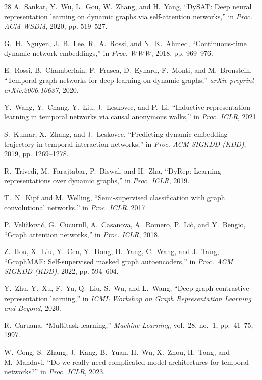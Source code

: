 \documentclass[journal]{IEEEtran}
\begin{document}
\begin{thebibliography}{28}
		A.~Sankar, Y.~Wu, L.~Gou, W.~Zhang, and H.~Yang,
		``DySAT: Deep neural representation learning on dynamic graphs via self-attention networks,''
		in \emph{Proc. ACM WSDM}, 2020, pp. 519--527.

		G.~H.~Nguyen, J.~B.~Lee, R.~A.~Rossi, and N.~K.~Ahmed,
		``Continuous-time dynamic network embeddings,''
		in \emph{Proc. WWW}, 2018, pp. 969--976.

		E.~Rossi, B.~Chamberlain, F.~Frasca, D.~Eynard, F.~Monti, and M.~Bronstein,
		``Temporal graph networks for deep learning on dynamic graphs,''
		\emph{arXiv preprint arXiv:2006.10637}, 2020.

		Y.~Wang, Y.~Chang, Y.~Liu, J.~Leskovec, and P.~Li,
		``Inductive representation learning in temporal networks via causal anonymous walks,''
		in \emph{Proc. ICLR}, 2021.

		S.~Kumar, X.~Zhang, and J.~Leskovec,
		``Predicting dynamic embedding trajectory in temporal interaction networks,''
		in \emph{Proc. ACM SIGKDD (KDD)}, 2019, pp. 1269--1278.

		R.~Trivedi, M.~Farajtabar, P.~Biswal, and H.~Zha,
		``DyRep: Learning representations over dynamic graphs,''
		in \emph{Proc. ICLR}, 2019.

		T.~N.~Kipf and M.~Welling,
		``Semi-supervised classification with graph convolutional networks,''
		in \emph{Proc. ICLR}, 2017.

		P.~Veli\v{c}kovi\'{c}, G.~Cucurull, A.~Casanova, A.~Romero, P.~Li\`{o}, and Y.~Bengio,
		``Graph attention networks,''
		in \emph{Proc. ICLR}, 2018.

		Z.~Hou, X.~Liu, Y.~Cen, Y.~Dong, H.~Yang, C.~Wang, and J.~Tang,
		``GraphMAE: Self-supervised masked graph autoencoders,''
		in \emph{Proc. ACM SIGKDD (KDD)}, 2022, pp. 594--604.

		Y.~Zhu, Y.~Xu, F.~Yu, Q.~Liu, S.~Wu, and L.~Wang,
		``Deep graph contrastive representation learning,''
		in \emph{ICML Workshop on Graph Representation Learning and Beyond}, 2020.

		R.~Caruana,
		``Multitask learning,''
		\emph{Machine Learning}, vol.~28, no.~1, pp.~41--75, 1997.

W.~Cong, S.~Zhang, J.~Kang, B.~Yuan, H.~Wu, X.~Zhou, H.~Tong, and M.~Mahdavi,
``Do we really need complicated model architectures for temporal networks?''
in \emph{Proc. ICLR}, 2023.


\end{thebibliography}
\end{document}
